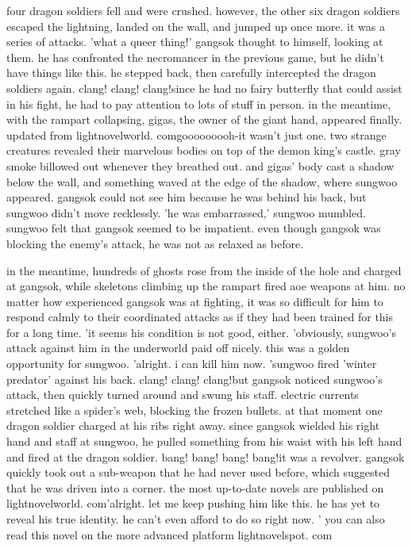  four dragon soldiers fell and were crushed.
 however, the other six dragon soldiers escaped the lightning, landed on the wall, and jumped up once more.
 it was a series of attacks.
 'what a queer thing!' gangsok thought to himself, looking at them.
he has confronted the necromancer in the previous game, but he didn't have things like this.
 he stepped back, then carefully intercepted the dragon soldiers again.
clang! clang! clang!since he had no fairy butterfly that could assist in his fight, he had to pay attention to lots of stuff in person.
 in the meantime, with the rampart collapsing, gigas, the owner of the giant hand, appeared finally.
updated from lightnovelworld.
comgooooooooh-it wasn't just one.
 two strange creatures revealed their marvelous bodies on top of the demon king's castle.
gray smoke billowed out whenever they breathed out.
 and gigas' body cast a shadow below the wall, and something waved at the edge of the shadow, where sungwoo appeared.
gangsok could not see him because he was behind his back, but sungwoo didn't move recklessly.
'he was embarrassed,' sungwoo mumbled.
 sungwoo felt that gangsok seemed to be impatient.
 even though gangsok was blocking the enemy's attack, he was not as relaxed as before.


in the meantime, hundreds of ghosts rose from the inside of the hole and charged at gangsok, while skeletons climbing up the rampart fired aoe weapons at him.
no matter how experienced gangsok was at fighting, it was so difficult for him to respond calmly to their coordinated attacks as if they had been trained for this for a long time.
'it seems his condition is not good, either.
'obviously, sungwoo's attack against him in the underworld paid off nicely.
 this was a golden opportunity for sungwoo.
'alright.
 i can kill him now.
'sungwoo fired 'winter predator' against his back.
 clang! clang! clang!but gangsok noticed sungwoo's attack, then quickly turned around and swung his staff.
electric currents stretched like a spider's web, blocking the frozen bullets.
at that moment one dragon soldier charged at his ribs right away.
since gangsok wielded his right hand and staff at sungwoo, he pulled something from his waist with his left hand and fired at the dragon soldier.
bang! bang! bang! bang!it was a revolver.
gangsok quickly took out a sub-weapon that he had never used before, which suggested that he was driven into a corner.
the most up-to-date novels are published on lightnov­elworld.
com'alright.
 let me keep pushing him like this.
 he has yet to reveal his true identity.
 he can't even afford to do so right now.
' you can also read this novel on the more advanced platform lightnovelspot.
com

 